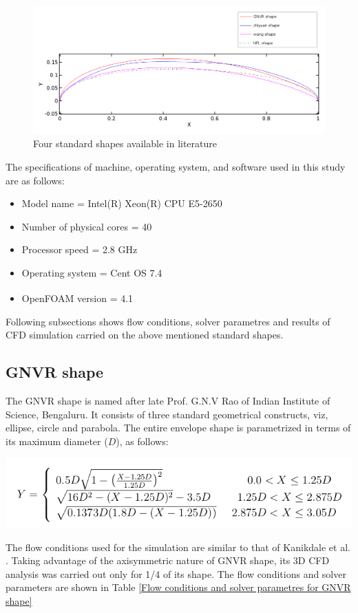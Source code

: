 \begin{figure}[H]
	\centering
	\includegraphics[width=400 pt]{rnd/all_profiles.png}
	\caption{Four standard shapes available in literature}
	\label{All profiles} 
\end{figure}
The specifications of machine, operating system, and software used in this study are as follows:
\begin{itemize}
	\item Model name = Intel(R) Xeon(R) CPU E5-2650
	\item Number of physical cores = 40
	\item Processor speed = 2.8 GHz
	\item Operating system = Cent OS 7.4
	\item OpenFOAM\textsuperscript{\textregistered} version = 4.1
\end{itemize}
Following subsections shows flow conditions, solver parametres and results of CFD simulation carried on the above mentioned standard shapes. 

\subsection{GNVR shape \cite{Ram}}
The GNVR shape \cite{Ram} is named after late Prof. G.N.V Rao of Indian Institute of Science, Bengaluru. It consists of three standard geometrical constructs, viz, ellipse, circle and parabola. The entire envelope shape is parametrized in terms of its maximum diameter ($D$), as follows:
\begin{center}
	\includegraphics[width= 200 pt]{rnd/GNVR_equations.png}
\end{center}



The flow conditions used for the simulation are similar to that of Kanikdale et al. \cite{Kanikdale}. Taking advantage of the axisymmetric nature of GNVR shape, its 3D CFD analysis was carried out only for 1/4 of its shape. The flow conditions and solver parameters are shown in Table \ref{Flow conditions and solver parametres for GNVR shape}

